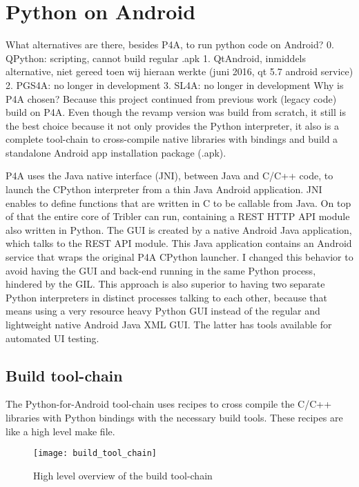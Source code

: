 \section{Python on Android}
What alternatives are there, besides P4A, to run python code on Android?
0. QPython: scripting, cannot build regular .apk
1. QtAndroid, inmiddels alternative, niet gereed toen wij hieraan werkte (juni 2016, qt 5.7 android service)
2. PGS4A: no longer in development
3. SL4A: no longer in development
Why is P4A chosen?
Because this project continued from previous work (legacy code) build on P4A.
Even though the revamp version was build from scratch, it still is the best choice because it not only provides the Python interpreter, it also is a complete tool-chain to cross-compile native libraries with bindings and build a standalone Android app installation package (.apk).


P4A uses the Java native interface (JNI), between Java and C/C++ code, to launch the CPython interpreter from a thin Java Android application.
JNI enables to define functions that are written in C to be callable from Java.
On top of that the entire core of Tribler can run, containing a REST HTTP API module also written in Python.
The GUI is created by a native Android Java application, which talks to the REST API module.
This Java application contains an Android service that wraps the original P4A CPython launcher.
I changed this behavior to avoid having the GUI and back-end running in the same Python process, hindered by the GIL.
This approach is also superior to having two separate Python interpreters in distinct processes talking to each other, because that means using a very resource heavy Python GUI instead of the regular and lightweight native Android Java XML GUI.
The latter has tools available for automated UI testing.


\subsection{Build tool-chain}
The Python-for-Android tool-chain uses recipes to cross compile the C/C++ libraries with Python bindings with the necessary build tools.
These recipes are like a high level make file.

\begin{figure}
	\centering
	\texttt{[image: build\_tool\_chain]}
	\caption{High level overview of the build tool-chain}
	\label{fig:build_tool_chain}
\end{figure}


